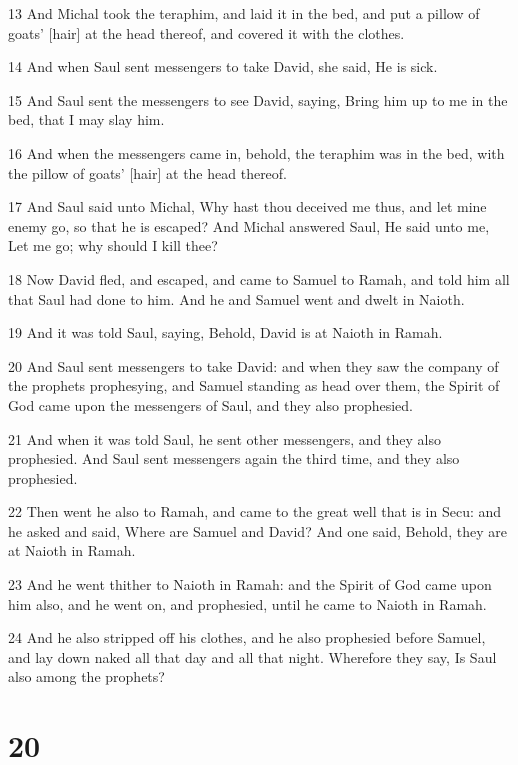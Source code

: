 \par 13 And Michal took the teraphim, and laid it in the bed, and put a pillow of goats' [hair] at the head thereof, and covered it with the clothes.
\par 14 And when Saul sent messengers to take David, she said, He is sick.
\par 15 And Saul sent the messengers to see David, saying, Bring him up to me in the bed, that I may slay him.
\par 16 And when the messengers came in, behold, the teraphim was in the bed, with the pillow of goats' [hair] at the head thereof.
\par 17 And Saul said unto Michal, Why hast thou deceived me thus, and let mine enemy go, so that he is escaped? And Michal answered Saul, He said unto me, Let me go; why should I kill thee?
\par 18 Now David fled, and escaped, and came to Samuel to Ramah, and told him all that Saul had done to him. And he and Samuel went and dwelt in Naioth.
\par 19 And it was told Saul, saying, Behold, David is at Naioth in Ramah.
\par 20 And Saul sent messengers to take David: and when they saw the company of the prophets prophesying, and Samuel standing as head over them, the Spirit of God came upon the messengers of Saul, and they also prophesied.
\par 21 And when it was told Saul, he sent other messengers, and they also prophesied. And Saul sent messengers again the third time, and they also prophesied.
\par 22 Then went he also to Ramah, and came to the great well that is in Secu: and he asked and said, Where are Samuel and David? And one said, Behold, they are at Naioth in Ramah.
\par 23 And he went thither to Naioth in Ramah: and the Spirit of God came upon him also, and he went on, and prophesied, until he came to Naioth in Ramah.
\par 24 And he also stripped off his clothes, and he also prophesied before Samuel, and lay down naked all that day and all that night. Wherefore they say, Is Saul also among the prophets?

\chapter{20}

